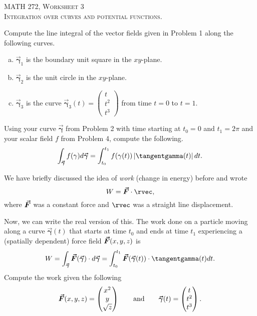 \documentclass[12pt]{article} %
\newcommand{\curvegamma}{\boldsymbol{\vec{\gamma}}}
\begin{document}
\begin{center}
   \textsc{\large MATH 272, Worksheet 3}\\
   \textsc{Integration over curves and potential functions.}
\end{center}
\vspace{.5cm}

\begin{problem}
Compute the line integral of the vector fields given in Problem 1 along the following curves.
\begin{multicols}{2}
\begin{enumerate}[(a)]
    \item $\curvegamma_1$ is the boundary unit square in the $xy$-plane.  
    \item $\curvegamma_2$ is the unit circle in the $xy$-plane.
    \item $\curvegamma_3$ is the curve $\curvegamma_3(t)=\begin{pmatrix} t \\ t^2 \\ t^3 \end{pmatrix}$ from time $t=0$ to $t=1$.
\end{enumerate}
\end{multicols}
\end{problem}

\begin{problem}
    Using your curve $\curvegamma$ from Problem 2 with time starting at $t_0=0$ and $t_1=2\pi$ and your scalar field $f$ from Problem 4, compute the following. 
    \[
    \int_{\curvegamma} f(\gamma)d\curvegamma = \int_{t_0}^{t_1} f(\gamma(t))\left|\tangentgamma(t)\right|dt.
    \]
\end{problem}

\begin{problem} 
We have briefly discussed the idea of \emph{work} (change in energy) before and wrote
\[
W = \forcevec \cdot \rvec,
\]
where $\boldsymbol{\vec{F}}$ was a constant force and $\rvec$ was a straight line displacement.

Now, we can write the real version of this. The work done on a particle moving along a curve $\curvegamma(t)$ that starts at time $t_0$ and ends at time $t_1$ experiencing a (spatially dependent) force field $\boldsymbol{\vec{F}}(x,y,z)$ is
\[
W = \int_{\curvegamma} \forcevec(\curvegamma) \cdot d\curvegamma = \int_{t_0}^{t_1} \forcevec(\curvegamma(t))\cdot \tangentgamma(t) dt.
\]
Compute the work given the following
\[
\forcevec(x,y,z) = \begin{pmatrix} x^2 \\ y \\ \sqrt{z} \end{pmatrix} \qquad \textrm{and} \qquad \curvegamma(t) = \begin{pmatrix} t \\ t^2 \\ t^3 \end{pmatrix}.
\]
\end{problem}
\end{document}
